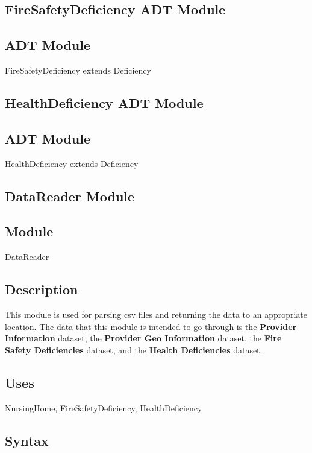 \documentclass[12pt]{article}
\begin{document}
\newpage

\subsection{FireSafetyDeficiency ADT Module}
\subsection* {ADT Module}
FireSafetyDeficiency extends Deficiency

\subsection{HealthDeficiency ADT Module}
\subsection* {ADT Module}
HealthDeficiency extends Deficiency


\newpage

\subsection{DataReader Module}

\subsection*{Module}
DataReader

\subsection*{Description}

This module is used for parsing csv files and returning the data to an appropriate location. The data that this module is intended to go through is the \textbf{Provider Information} dataset, the \textbf{Provider Geo Information} dataset, the \textbf{Fire Safety Deficiencies} dataset, and the \textbf{Health Deficiencies} dataset. 

\subsection* {Uses}

NursingHome, FireSafetyDeficiency, HealthDeficiency

\subsection* {Syntax}
\end{document}
